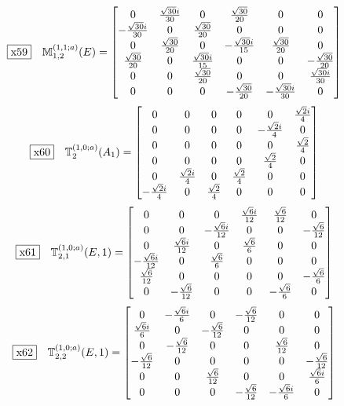 \documentclass[fleqn,10pt,landscape]{jsarticle}
\begin{document}
\begin{dmath*}
\fbox{x59}\quad \mathbb{M}_{1,2}^{(1,1;a)}(E)=\begin{bmatrix} 0 & \frac{\sqrt{30} i}{30} & 0 & \frac{\sqrt{30}}{20} & 0 & 0 \\ - \frac{\sqrt{30} i}{30} & 0 & \frac{\sqrt{30}}{20} & 0 & 0 & 0 \\ 0 & \frac{\sqrt{30}}{20} & 0 & - \frac{\sqrt{30} i}{15} & \frac{\sqrt{30}}{20} & 0 \\ \frac{\sqrt{30}}{20} & 0 & \frac{\sqrt{30} i}{15} & 0 & 0 & - \frac{\sqrt{30}}{20} \\ 0 & 0 & \frac{\sqrt{30}}{20} & 0 & 0 & \frac{\sqrt{30} i}{30} \\ 0 & 0 & 0 & - \frac{\sqrt{30}}{20} & - \frac{\sqrt{30} i}{30} & 0 \end{bmatrix}
\end{dmath*}
\begin{dmath*}
\fbox{x60}\quad \mathbb{T}_{2}^{(1,0;a)}(A_{1})=\begin{bmatrix} 0 & 0 & 0 & 0 & 0 & \frac{\sqrt{2} i}{4} \\ 0 & 0 & 0 & 0 & - \frac{\sqrt{2} i}{4} & 0 \\ 0 & 0 & 0 & 0 & 0 & \frac{\sqrt{2}}{4} \\ 0 & 0 & 0 & 0 & \frac{\sqrt{2}}{4} & 0 \\ 0 & \frac{\sqrt{2} i}{4} & 0 & \frac{\sqrt{2}}{4} & 0 & 0 \\ - \frac{\sqrt{2} i}{4} & 0 & \frac{\sqrt{2}}{4} & 0 & 0 & 0 \end{bmatrix}
\end{dmath*}
\begin{dmath*}
\fbox{x61}\quad \mathbb{T}_{2,1}^{(1,0;a)}(E,1)=\begin{bmatrix} 0 & 0 & 0 & \frac{\sqrt{6} i}{12} & \frac{\sqrt{6}}{12} & 0 \\ 0 & 0 & - \frac{\sqrt{6} i}{12} & 0 & 0 & - \frac{\sqrt{6}}{12} \\ 0 & \frac{\sqrt{6} i}{12} & 0 & \frac{\sqrt{6}}{6} & 0 & 0 \\ - \frac{\sqrt{6} i}{12} & 0 & \frac{\sqrt{6}}{6} & 0 & 0 & 0 \\ \frac{\sqrt{6}}{12} & 0 & 0 & 0 & 0 & - \frac{\sqrt{6}}{6} \\ 0 & - \frac{\sqrt{6}}{12} & 0 & 0 & - \frac{\sqrt{6}}{6} & 0 \end{bmatrix}
\end{dmath*}
\begin{dmath*}
\fbox{x62}\quad \mathbb{T}_{2,2}^{(1,0;a)}(E,1)=\begin{bmatrix} 0 & - \frac{\sqrt{6} i}{6} & 0 & - \frac{\sqrt{6}}{12} & 0 & 0 \\ \frac{\sqrt{6} i}{6} & 0 & - \frac{\sqrt{6}}{12} & 0 & 0 & 0 \\ 0 & - \frac{\sqrt{6}}{12} & 0 & 0 & \frac{\sqrt{6}}{12} & 0 \\ - \frac{\sqrt{6}}{12} & 0 & 0 & 0 & 0 & - \frac{\sqrt{6}}{12} \\ 0 & 0 & \frac{\sqrt{6}}{12} & 0 & 0 & \frac{\sqrt{6} i}{6} \\ 0 & 0 & 0 & - \frac{\sqrt{6}}{12} & - \frac{\sqrt{6} i}{6} & 0 \end{bmatrix}
\end{dmath*}
\end{document}

